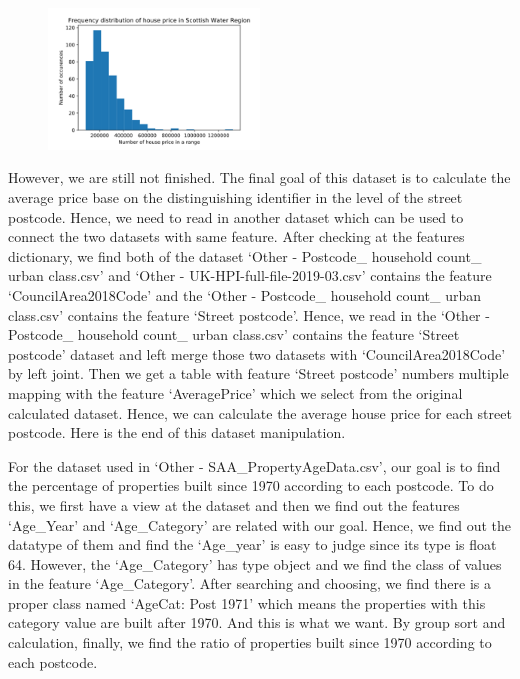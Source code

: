 \documentclass[11pt,twoside]{article}
\numberwithin{Theorem}{section}
\numberwithin{Definition}{section}
\numberwithin{Lemma}{section}
\numberwithin{Algorithm}{section}
\numberwithin{equation}{section}
\begin{document}
\begin{figure}[!ht]
    \centering
    \includegraphics[width=0.5\textwidth]{p8.png}
    \end{figure}

However, we are still not finished. The final goal of this dataset is to calculate the average price base on the distinguishing identifier in the level of the street postcode. Hence, we need to read in another dataset which can be used to connect the two datasets with same feature. After checking at the features dictionary, we find both of the dataset ‘Other - Postcode\_ household count\_ urban class.csv’ and ‘Other - UK-HPI-full-file-2019-03.csv’ contains the feature ‘CouncilArea2018Code’ and the ‘Other - Postcode\_ household count\_ urban class.csv’ contains the feature ‘Street postcode’. Hence, we read in the ‘Other - Postcode\_ household count\_ urban class.csv’ contains the feature ‘Street postcode’ dataset and left merge those two datasets with ‘CouncilArea2018Code’ by left joint. Then we get a table with feature ‘Street postcode’ numbers multiple mapping with the feature ‘AveragePrice’ which we select from the original calculated dataset. Hence, we can calculate the average house price for each street postcode. Here is the end of this dataset manipulation.

For the dataset used in ‘Other - SAA\_PropertyAgeData.csv’, our goal is to find the percentage of properties built since 1970 according to each postcode. To do this, we first have a view at the dataset and then we find out the features ‘Age\_Year’ and ‘Age\_Category’ are related with our goal. Hence, we find out the datatype of them and find the ‘Age\_year’ is easy to judge since its type is float 64. However, the ‘Age\_Category’ has type object and we find the class of values in the feature ‘Age\_Category’. After searching and choosing, we find there is a proper class named ‘AgeCat: Post 1971’ which means the properties with this category value are built after 1970. And this is what we want. By group sort and calculation, finally, we find the ratio of properties built since 1970 according to each postcode.
\end{document}
